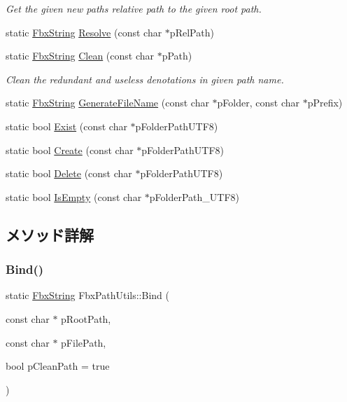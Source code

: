 \begin{DoxyCompactItemize}
\begin{DoxyCompactList}\small\item\em Get the given new path\textquotesingle{}s relative path to the given root path. \end{DoxyCompactList}\item 
static \hyperlink{class_fbx_string}{Fbx\+String} \hyperlink{class_fbx_path_utils_a5adc2b4d7bed904ba22f3613f9bb729a}{Resolve} (const char $\ast$p\+Rel\+Path)
\item 
static \hyperlink{class_fbx_string}{Fbx\+String} \hyperlink{class_fbx_path_utils_a33d8212ceaa902e1161882ab8d69e3ca}{Clean} (const char $\ast$p\+Path)
\begin{DoxyCompactList}\small\item\em Clean the redundant and useless denotations in given path name. \end{DoxyCompactList}\item 
static \hyperlink{class_fbx_string}{Fbx\+String} \hyperlink{class_fbx_path_utils_a0680775ad53444cc7dd91bdd537384ca}{Generate\+File\+Name} (const char $\ast$p\+Folder, const char $\ast$p\+Prefix)
\item 
static bool \hyperlink{class_fbx_path_utils_a5098828efd68614f77bc7bbe5f73f7cf}{Exist} (const char $\ast$p\+Folder\+Path\+U\+T\+F8)
\item 
static bool \hyperlink{class_fbx_path_utils_aa644a8ad1e94eb8a522e6fd653824e93}{Create} (const char $\ast$p\+Folder\+Path\+U\+T\+F8)
\item 
static bool \hyperlink{class_fbx_path_utils_a7061a14d4a9f5dae1353d16d7155ee06}{Delete} (const char $\ast$p\+Folder\+Path\+U\+T\+F8)
\item 
static bool \hyperlink{class_fbx_path_utils_a3b887263947d818084273ed982617fec}{Is\+Empty} (const char $\ast$p\+Folder\+Path\+\_\+\+U\+T\+F8)
\end{DoxyCompactItemize}


\subsection{メソッド詳解}
\mbox{\label{class_fbx_path_utils_a1653196effd4938fe520afd70ad09c56}} 
\subsubsection{\texorpdfstring{Bind()}{Bind()}}
{\footnotesize\ttfamily static \hyperlink{class_fbx_string}{Fbx\+String} Fbx\+Path\+Utils\+::\+Bind (\begin{DoxyParamCaption}\item[{const char $\ast$}]{p\+Root\+Path,  }\item[{const char $\ast$}]{p\+File\+Path,  }\item[{bool}]{p\+Clean\+Path = {\ttfamily true} }\end{DoxyParamCaption})\hspace{0.3cm}{\ttfamily [static]}}

